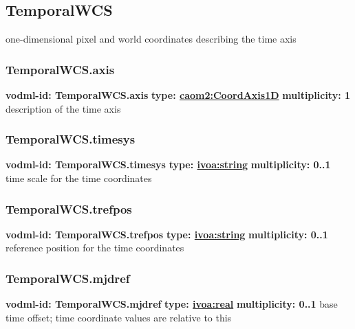   \subsection{TemporalWCS}
  \label{sect:TemporalWCS}
    one-dimensional pixel and world coordinates describing the time axis

    \subsubsection{TemporalWCS.axis}
      \textbf{vodml-id: TemporalWCS.axis} \newline
      \textbf{type: \hyperref[sect:CoordAxis1D]{caom2:CoordAxis1D}} \newline
      \textbf{multiplicity: 1} \newline
      description of the time axis

    \subsubsection{TemporalWCS.timesys}
      \textbf{vodml-id: TemporalWCS.timesys} \newline
      \textbf{type: \hyperref[sect:ivoa]{ivoa:string}} \newline
      \textbf{multiplicity: 0..1} \newline
      time scale for the time coordinates

    \subsubsection{TemporalWCS.trefpos}
      \textbf{vodml-id: TemporalWCS.trefpos} \newline
      \textbf{type: \hyperref[sect:ivoa]{ivoa:string}} \newline
      \textbf{multiplicity: 0..1} \newline
      reference position for the time coordinates

    \subsubsection{TemporalWCS.mjdref}
      \textbf{vodml-id: TemporalWCS.mjdref} \newline
      \textbf{type: \hyperref[sect:ivoa]{ivoa:real}} \newline
      \textbf{multiplicity: 0..1} \newline
      base time offset; time coordinate values are relative to this

